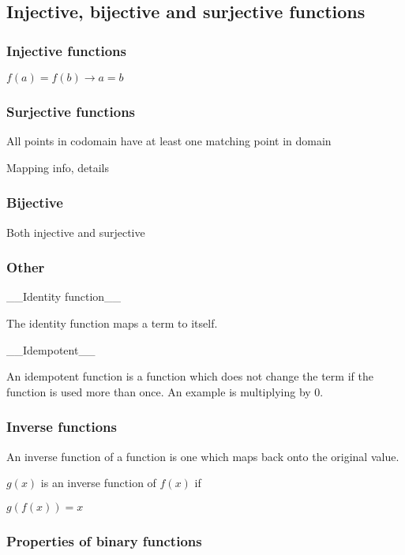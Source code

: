 
\subsection{Injective, bijective and surjective functions}

\subsubsection{Injective functions}

$f(a)=f(b)\rightarrow a=b$

\subsubsection{Surjective functions}

All points in codomain have at least one matching point in domain

Mapping info, details

\subsubsection{Bijective}

Both injective and surjective

\subsubsection{Other}

__Identity function__

The identity function maps a term to itself.

__Idempotent__

An idempotent function is a function which does not change the term if the function is used more than once. An example is multiplying by \(0\).

\subsubsection{Inverse functions}

An inverse function of a function is one which maps back onto the original value.

\(g(x)\) is an inverse function of \(f(x)\) if	

$g(f(x))=x$

\subsubsection{Properties of binary functions}

